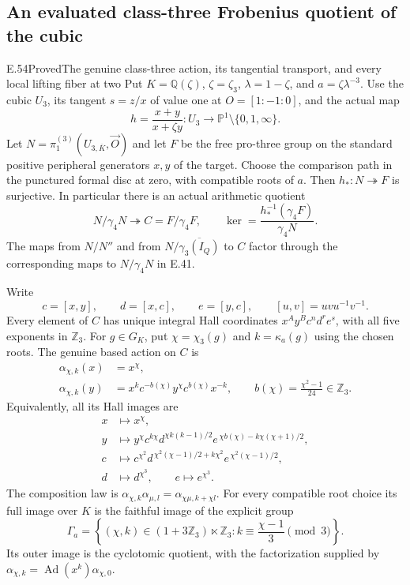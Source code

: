 \subsection{An evaluated class-three Frobenius quotient of the cubic}

\begin{statement}{E.54}{Proved}{The genuine class-three action, its tangential transport, and every local lifting fiber at two}
Put $K=\mathbb Q(\zeta)$, $\zeta=\zeta_3$, $\lambda=1-\zeta$,
and $a=\zeta\lambda^{-3}$. Use the cubic $U_3$, its tangent
$s=z/x$ of value one at $O=[1:-1:0]$, and the actual map
\[
 h=\frac{x+y}{x+\zeta y}:U_3\longrightarrow
       \mathbb P^1\setminus\{0,1,\infty\}.
 \tag{E54.1}
\]
Let $N=\pi_1^{(3)}(U_{3,\overline K},\vec O)$ and let $F$ be
the free pro-three group on the standard positive peripheral
generators $x,y$ of the target. Choose the comparison path in
the punctured formal disc at zero, with compatible roots of $a$.
Then $h_*:N\twoheadrightarrow F$ is surjective. In particular
there is an actual arithmetic quotient
\[
 N/\gamma_4N\twoheadrightarrow C=F/\gamma_4F,\qquad
 \ker=\frac{h_*^{-1}(\gamma_4F)}{\gamma_4N}.
 \tag{E54.2}
\]
The maps from $N/N''$ and from
$N/\overline{\gamma_3(I_Q)}$ to $C$ factor through the
corresponding maps to $N/\gamma_4N$ in E.41.

Write
\[
 c=[x,y],\qquad d=[x,c],\qquad e=[y,c],
 \qquad [u,v]=uvu^{-1}v^{-1}.
 \tag{E54.3}
\]
Every element of $C$ has unique integral Hall coordinates
$x^A y^B c^n d^r e^s$, with all five exponents in $\mathbb Z_3$.
For $g\in G_K$, put $\chi=\chi_3(g)$ and $k=\kappa_a(g)$
using the chosen roots. The genuine based action on $C$ is
\[
 \begin{split}
 \alpha_{\chi,k}(x)&=x^\chi,\\
 \alpha_{\chi,k}(y)&=
       x^k c^{-b(\chi)}y^\chi c^{b(\chi)}x^{-k},
       \qquad b(\chi)=\frac{\chi^2-1}{24}\in\mathbb Z_3.
 \end{split}
 \tag{E54.4}
\]
Equivalently, all its Hall images are
\[
 \begin{aligned}
 x&\longmapsto x^\chi,\\
 y&\longmapsto
 y^\chi c^{k\chi}
 d^{\chi k(k-1)/2}
 e^{\,\chi b(\chi)-k\chi(\chi+1)/2},\\
 c&\longmapsto
 c^{\chi^2}
 d^{\,\chi^2(\chi-1)/2+k\chi^2}
 e^{\,\chi^2(\chi-1)/2},\\
 d&\longmapsto d^{\chi^3},\qquad
 e\longmapsto e^{\chi^3}.
 \end{aligned}
 \tag{E54.5}
\]
The composition law is
$\alpha_{\chi,k}\alpha_{\mu,l}=\alpha_{\chi\mu,k+\chi l}$.
For every compatible root choice its full image over $K$ is
the faithful image of the explicit group
\[
 \Gamma_a=
 \left\{(\chi,k)\in(1+3\mathbb Z_3)\ltimes\mathbb Z_3:
                 k\equiv\frac{\chi-1}{3}\pmod3\right\}.
 \tag{E54.6}
\]
Its outer image is the cyclotomic quotient, with the
factorization supplied by
$\alpha_{\chi,k}=\operatorname{Ad}(x^k)\alpha_{\chi,0}$.


\end{statement}
